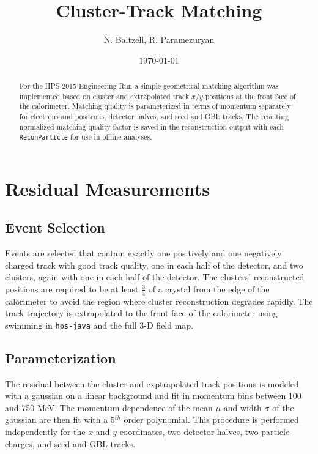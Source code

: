 \documentclass[amsmath,amssymb,notitlepage,12pt]{revtex4-1}
\begin{document}

\title{Cluster-Track Matching}
\author{N. Baltzell, R. Paramezuryan}
\date{\today}
\begin{abstract}
    For the HPS 2015 Engineering Run a simple geometrical matching algorithm was implemented based on cluster and extrapolated track $x/y$ positions at the front face of the calorimeter.  Matching quality is parameterized in terms of momentum separately for electrons and positrons, detector halves, and seed and GBL tracks.  The resulting normalized matching quality factor is saved in the reconstruction output with each \texttt{ReconParticle} for use in offline analyses.
\end{abstract}
\maketitle

\section{Residual Measurements}
\subsection{Event Selection}
Events are selected that contain exactly one positively and one negatively charged track with good track quality, one in each half of the detector, and two clusters, again with one in each half of the detector.  The clusters' reconstructed positions are required to be at least $\frac{3}{4}$ of a crystal from the edge of the calorimeter to avoid the region where cluster reconstruction degrades rapidly.  The track trajectory is extrapolated to the front face of the calorimeter using swimming in \texttt{hps-java} and the full 3-D field map.

\subsection{Parameterization}
The residual between the cluster and exptrapolated track positions is modeled with a gaussian on a linear background and fit in momentum bins between 100 and 750 MeV.  The momentum dependence of the mean $\mu$ and width $\sigma$ of the gaussian are then fit with a 5$^{th}$ order polynomial.  This procedure is performed independently for the $x$ and $y$ coordinates, two detector halves, two particle charges, and seed and GBL tracks.
\end{document}
